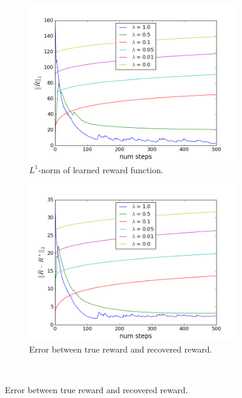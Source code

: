 \documentclass[10pt,a4paper]{article}
\begin{document}
\begin{figure}
    \centering
    \begin{subfigure}[b]{0.65\textwidth}
        \includegraphics[width=\textwidth]{figs/reward_norm_reg_test.png}
        \caption{$L^1$-norm of learned reward function.}
        \label{subfig:reg_L1-norm}
    \end{subfigure}
    \begin{subfigure}[b]{0.65\textwidth}
        \includegraphics[width=\textwidth]{figs/reward_diff_reg_test.png}
        \caption{Error between true reward and recovered reward.}
        \label{subfig:reg_reward_diff}
    \end{subfigure}
    ~ %
    

\end{figure}
\end{document}
